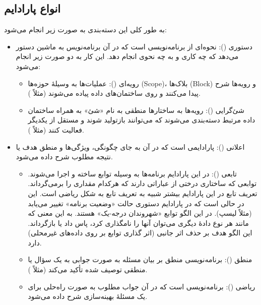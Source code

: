 \documentclass[a4paper]{article}
\begin{document}
\subsection{انواع پارادایم}
به طور کلی این دسته‌بندی به صورت زیر انجام می‌شود:
\begin{itemize}
  \item دستوری (): نحوه‌ای از برنامه‌نویسی است که در آن برنامه‌نویس به ماشین
    دستور می‌دهد که چه کاری و به چه نحوی انجام دهد. این کار به دو صورت زیر انجام می‌شود:
  \begin{itemize}
    \item رویه‌ای (): عملیات‌ها به وسیلهٔ حوزه‌ها (Scope)، بلاک‌ها (Block) و رویه‌ها شرح پیدا می‌کنند و روی ساختمان‌های داده پیاده می‌شوند (مثلاً ).
    \item شئ‌گرایی (): رویه‌ها به ساختارها منطقی به نام «شئ» به همراه ساختمان داده مرتبط دسته‌بندی می‌شوند که می‌توانند بازتولید شوند و مستقل از یکدیگر فعالیت کنند (مثلاً ).
  \end{itemize}
  \item اعلانی (): پارادایمی است که در آن به جای چگونگی، ویژگی‌ها و منطق هدف یا نتیجه مطلوب شرح داده می‌شود.
  \begin{itemize}
    \item تابعی (): در این پارادایم برنامه‌ها به وسیله توابع ساخته و اجرا می‌شوند. توابعی که ساختاری درختی از عباراتی دارند که هرکدام مقداری را برمی‌گرداند.
    تعریف تابع در این پارادایم بیشتر شبیه به تعریف تابع به شکل ریاضی است.
    این در حالی است که در پارادایم دستوری حالت «وضعیت برنامه» تغییر می‌یابد (مثلاً لیسپ).
    در این الگو توابع «شهروندان درجه-یک» هستند. به این معنی که مانند هر نوع دادهٔ دیگری می‌توان آنها را نامگذاری کرد، پاس داد یا بازگرداند.
    این الگو هدف بر حذف اثر جانبی (اثر گذاری توابع بر روی داده‌های غیرمحلی) دارد.
    \item منطق (): برنامه‌نویسی منطق بر بیان مسئله به صورت جوابی به یک سؤال یا منطقی توصیف شده تأکید می‌کند (مثلاً ).
    \item ریاضی (): برنامه‌نویسی است که در آن جواب مطلوب به صورت راه‌حلی برای یک مسئلهٔ بهینه‌سازی شرح داده می‌شود.
  \end{itemize}
\end{itemize}
\end{document}
